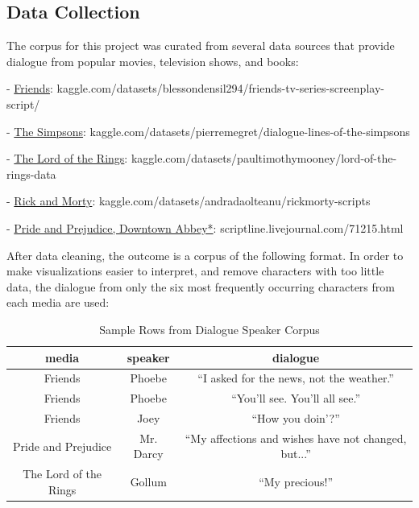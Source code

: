 \documentclass{article}
\begin{document}
\begin{titlepage}

\section{Data Collection}

The corpus for this project was curated from several data sources that provide dialogue from popular movies, television shows, and books:

- \href{https://www.kaggle.com/datasets/blessondensil294/friends-tv-series-screenplay-script/data?select=S01E01+Monica+Gets+A+Roommate.txt}{Friends}: kaggle.com/datasets/blessondensil294/friends-tv-series-screenplay-script/
 
- \href{https://www.kaggle.com/datasets/pierremegret/dialogue-lines-of-the-simpsons}{The Simpsons}: kaggle.com/datasets/pierremegret/dialogue-lines-of-the-simpsons

- \href{https://www.kaggle.com/datasets/paultimothymooney/lord-of-the-rings-data?select=lotr_scripts.csv}{The Lord of the Rings}: kaggle.com/datasets/paultimothymooney/lord-of-the-rings-data

- \href{https://www.kaggle.com/datasets/andradaolteanu/rickmorty-scripts}{Rick and Morty}: kaggle.com/datasets/andradaolteanu/rickmorty-scripts

- \href{https://scriptline.livejournal.com/71215.html#cutid6}{Pride and Prejudice, Downtown Abbey*}: scriptline.livejournal.com/71215.html

After data cleaning, the outcome is a corpus of the following format. In order to make visualizations easier to interpret, and remove characters with too little data, the dialogue from only the six most frequently occurring characters from each media are used:

\begin{table}[H]
    \centering
    \begin{tabular}{|c|c|c|}
        \hline
        \textbf{} \textbf{media} & \textbf{speaker} & \textbf{dialogue} \\
        \hline
        Friends & Phoebe &  ``I asked for the news, not the weather.'' \\
        Friends & Phoebe &  ``You'll see. You'll all see.'' \\
        Friends & Joey &  ``How you doin'?'' \\
        Pride and Prejudice & Mr. Darcy &  ``My affections and wishes have not changed, but...''  \\
        The Lord of the Rings & Gollum &  ``My precious!'' \\
        \hline
    \end{tabular}
    \caption{Sample Rows from Dialogue Speaker Corpus}
    \label{tab:images}
\end{table}


\end{titlepage}
\end{document}
